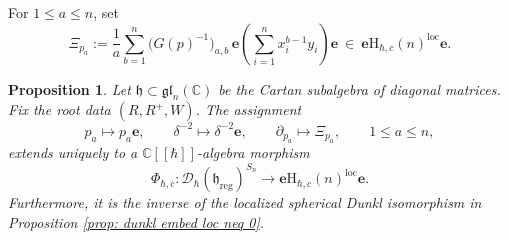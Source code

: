 \documentclass[11pt,reqno]{amsart}
\newtheorem{proposition}[theorem]{Proposition}
\theoremstyle{definition}
\newcommand{\bbC}{\mathbb{C}}
\newcommand{\gl}{\mathfrak{gl}}
\newcommand{\be}{\mathbf{e}}
\newcommand{\mD}{\mathcal{D}}
\newcommand{\rmH}{\mathrm{H}}
\newcommand{\fkh}{\mathfrak{h}}
\newcommand{\reg}{\mathrm{reg}}
\newcommand{\loc}{{\mathrm{loc}}}
\begin{document}
For \(1\leq a\leq n\), set
\begin{equation}\label{eq:power-sum-Cherednik-derivative}
	\Xi_{p_a}
	:=
	\frac1a\sum_{b=1}^n
	\bigl(G(p)^{-1}\bigr)_{a, b}\,
	\be\left(\sum_{i=1}^n x_i^{b-1}y_i\right)\be
	\ \in\
	\be\rmH_{\hbar,c}(n)^\loc\be.
\end{equation}


\begin{proposition}\label{prop: inverse dunkl power sum}
	Let \(\fkh \subset \gl_n (\bbC)\) be the Cartan subalgebra of diagonal matrices.
	Fix the root data \((R, R^+, W)\).
	The assignment
	\begin{equation}\label{for: inverse dunkl power sum}
		p_a\mapsto p_a\be,
		\qquad
		\delta^{-2}\mapsto\delta^{-2}\be,
		\qquad
		\partial_{p_a}\mapsto\Xi_{p_a},
		\qquad 1\leq a\leq n,
	\end{equation}
	extends uniquely to a \(\bbC[[\hbar]]\)-algebra morphism
	\[
	\Phi_{\hbar,c}:
	\mD_\hbar(\fkh_{\reg})^{S_n}
	\longrightarrow
	\be\rmH_{\hbar,c}(n)^\loc\be.
	\]
Furthermore, it is the inverse of the localized spherical Dunkl isomorphism in Proposition \ref{prop: dunkl embed loc neq 0}.
\end{proposition}
\end{document}

